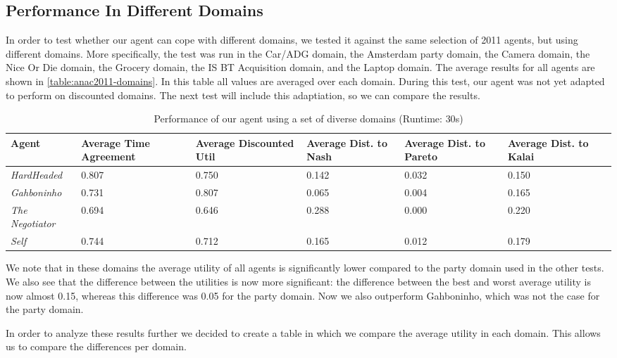 \subsection{Performance In Different Domains}
In order to test whether our agent can cope with different domains, we tested it against the same selection of 2011 agents, but using different domains. More specifically, the test was run in the Car/ADG domain, the Amsterdam party domain, the Camera domain, the Nice Or Die domain, the Grocery domain, the IS BT Acquisition  domain, and the Laptop domain. The average results for all agents are shown in \autoref{table:anac2011-domains}. In this table all values are averaged over each domain. During this test, our agent was not yet adapted to perform on discounted domains.
The next test will include this adaptiation, so we can compare the results.
\begin{table}[H]
  \centering
  \small
  \begin{tabular}{m{2cm}m{2cm}m{2cm}m{2cm}m{2cm}m{2cm}m{2cm}}
  \toprule
    Agent                     & Average Time Agreement & Average Discounted Util & Average Dist. to Nash & Average Dist. to Pareto & Average Dist. to Kalai \\
    \midrule
    \emph{HardHeaded}     & 0.807 & 0.750 & 0.142 & 0.032 & 0.150 \\ 
    \emph{Gahboninho}     & 0.731 & 0.807 & 0.065 & 0.004 & 0.165 \\ 
    \emph{The Negotiator} & 0.694 & 0.646 & 0.288 & 0.000 & 0.220 \\ 
    \emph{Self}           & 0.744 & 0.712 & 0.165 & 0.012 & 0.179 \\ 
    \bottomrule
  \end{tabular}
 \caption{Performance of our agent using a set of diverse domains (Runtime: $30$s) \label{table:anac2011-domains}}
\end{table}
We note that in these domains the average utility of all agents is significantly lower compared to the party domain used in the other tests. We also see that the difference between the utilities is now more significant: the difference between the best and worst average utility is now almost 0.15, whereas this difference was 0.05 for the party domain. Now we also outperform Gahboninho,
which was not the case for the party domain. 

In order to analyze these results further we decided to create a table in which we compare the average utility in each domain. This allows us to compare the differences per domain. 

